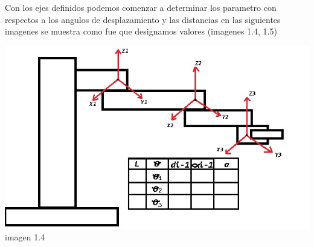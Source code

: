 \documentclass[10pt,a4paper]{article}
\begin{document}
{\Large Con los ejes definidos podemos comenzar a determinar los parametro con respectos a los angulos de desplazamiento y las distancias en las siguientes imagenes se muestra como fue que designamos valores  (imagenes 1.4, 1.5)

\begin{center}
\includegraphics[scale=0.5]{imagenes/Z.png} imagen 1.4
\end{center}

}
\end{document}

